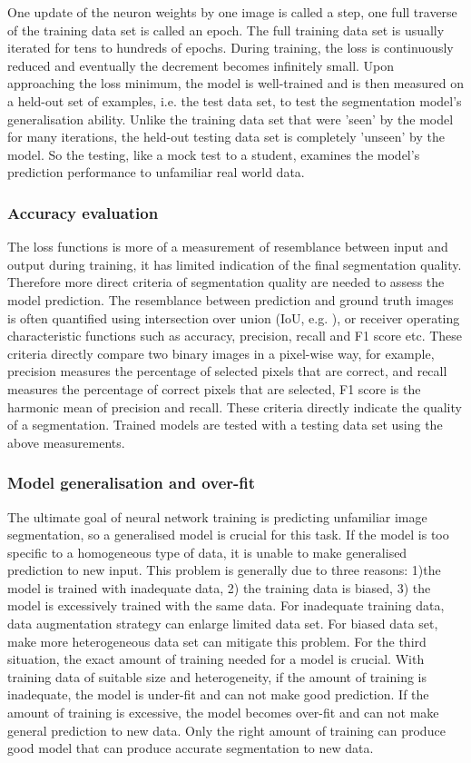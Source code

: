 One update of the neuron weights by one image is called a step, one full traverse of the training data set is called an epoch. The full training data set is usually iterated for tens to hundreds of epochs. During training, the loss is continuously reduced and eventually the decrement becomes infinitely small. Upon approaching the loss minimum, the model is well-trained and is then measured on a held-out set of examples, i.e. the test data set, to test the segmentation model's generalisation ability. Unlike the training data set that were 'seen' by the model for many iterations, the held-out testing data set is completely 'unseen' by the model. So the testing, like a mock test to a student, examines the model's prediction performance to unfamiliar real world data. 

\subsubsection{Accuracy evaluation}
The loss functions is more of a measurement of resemblance between input and output during training, it has limited indication of the final segmentation quality. Therefore more direct criteria of segmentation quality are needed to assess the model prediction. The resemblance between prediction and ground truth images is often quantified using intersection over union (IoU, e.g. \citep{rahman2016optimizing}), or receiver operating characteristic \citep{delong1988comparing} functions such as accuracy, precision, recall and F1 score etc. These criteria directly compare two binary images in a pixel-wise way, for example, precision measures the percentage of selected pixels that are correct, and recall measures the percentage of correct pixels that are selected, F1 score is the harmonic mean of precision and recall. These criteria directly indicate the quality of a segmentation. Trained models are tested with a testing data set using the above measurements. 

\subsubsection{Model generalisation and over-fit}
The ultimate goal of neural network training is predicting unfamiliar image segmentation, so a generalised model is crucial for this task. If the model is too specific to a homogeneous type of data, it is unable to make generalised prediction to new input. This problem is generally due to three reasons: 1)the model is trained with inadequate data, 2) the training data is biased, 3) the model is excessively trained with the same data. For inadequate training data, data augmentation strategy \citep{ronneberger2015u} can enlarge limited data set. For biased data set, make more heterogeneous data set can mitigate this problem. For the third situation, the exact amount of training needed for a model is crucial. With training data of suitable size and heterogeneity, if the amount of training is inadequate, the model is under-fit and can not make good prediction. If the amount of training is excessive, the model becomes over-fit and can not make general prediction to new data. Only the right amount of training can produce good model that can produce accurate segmentation to new data.

